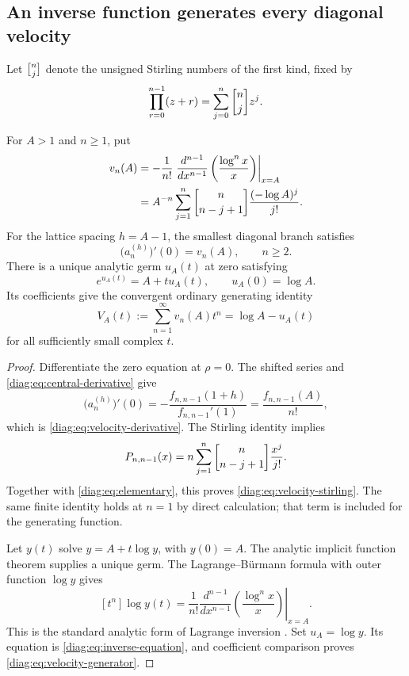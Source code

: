 \subsection{An inverse function generates every diagonal velocity}
\label{diag:subsec:inverse}

Let $\stirling{n}{j}$ denote the unsigned Stirling numbers of the
first kind, fixed by
\[
 \prod_{r=0}^{n-1}(z+r)=\sum_{j=0}^n\stirling{n}{j}z^j.
\]

\begin{theorem}\label{diag:thm:generator}
For $A>1$ and $n\geq1$, put
\begin{align}
 v_n(A)
  &=-\frac1{n!}\left.\frac{d^{n-1}}{dx^{n-1}}
                  \left(\frac{\log^n x}{x}\right)\right|_{x=A}
                  \label{diag:eq:velocity-derivative}\\
  &=A^{-n}\sum_{j=1}^n
       \stirling{n}{n-j+1}\frac{(-\log A)^j}{j!}.
                  \label{diag:eq:velocity-stirling}
\end{align}
For the lattice spacing $h=A-1$, the smallest diagonal branch satisfies
\begin{equation}\label{diag:eq:root-velocity}
 \bigl(a_n^{(h)}\bigr)'(0)=v_n(A),\qquad n\geq2.
\end{equation}
There is a unique analytic germ $u_A(t)$ at zero satisfying
\begin{equation}\label{diag:eq:inverse-equation}
 e^{u_A(t)}=A+t u_A(t),\qquad u_A(0)=\log A.
\end{equation}
Its coefficients give the convergent ordinary generating identity
\begin{equation}\label{diag:eq:velocity-generator}
 V_A(t):=\sum_{n=1}^{\infty}v_n(A)t^n=\log A-u_A(t)
\end{equation}
for all sufficiently small complex $t$.
\end{theorem}

\begin{proof}
Differentiate the zero equation at $\rho=0$.  The shifted series and
\eqref{diag:eq:central-derivative} give
\[
 \bigl(a_n^{(h)}\bigr)'(0)
   =-\frac{f_{n,n-1}(1+h)}{f_{n,n-1}'(1)}
   =\frac{f_{n,n-1}(A)}{n!},
\]
which is \eqref{diag:eq:velocity-derivative}.  The Stirling identity implies
\[
 P_{n,n-1}(x)
       =n\sum_{j=1}^n\stirling{n}{n-j+1}\frac{x^j}{j!}.
\]
Together with \eqref{diag:eq:elementary}, this proves
\eqref{diag:eq:velocity-stirling}.  The same finite identity holds at $n=1$
by direct calculation; that term is included for the generating function.

Let $y(t)$ solve $y=A+t\log y$, with $y(0)=A$.  The analytic implicit
function theorem supplies a unique germ.  The Lagrange--B\"urmann formula
with outer function $\log y$ gives
\[
 [t^n]\log y(t)
   =\frac1{n!}\left.\frac{d^{n-1}}{dx^{n-1}}
                        \left(\frac{\log^n x}{x}\right)\right|_{x=A}.
\]
This is the standard analytic form of Lagrange inversion
\cite{Gessel2016}.  Set $u_A=\log y$.  Its equation is
\eqref{diag:eq:inverse-equation}, and coefficient comparison proves
\eqref{diag:eq:velocity-generator}.
\end{proof}

